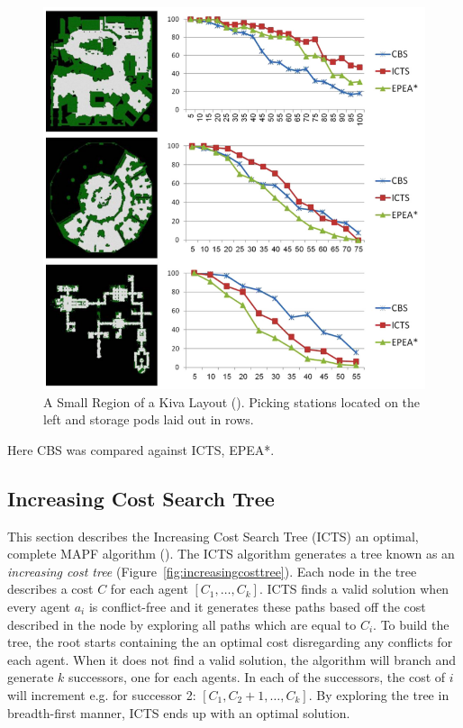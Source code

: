 \documentclass[a4paper,11pt]{article}
\begin{document}
\begin{figure}[!htb]
\begin{minipage}{0.4\linewidth}
	\includegraphics[width=\linewidth]{graphics/cbsresults1}
	\caption{A Small Region of a Kiva Layout (\cite{sharon2015conflict}). Picking stations located on the left and storage pods laid out in rows.}
	\label{cbsresults2}
	\end{minipage}
\end{figure}

Here CBS was compared against ICTS, EPEA*.

\subsection{Increasing Cost Search Tree}
This section describes the Increasing Cost Search Tree (ICTS) an optimal, complete MAPF algorithm (\cite{sharon2011increasing}). The ICTS algorithm generates a tree known as an \textit{increasing cost tree} (Figure~\ref{fig:increasingcosttree}). Each node in the tree describes a cost $C$ for each agent $[C_1,\dots,C_k]$. ICTS finds a valid solution when every agent $a_i$ is conflict-free and it generates these paths based off the cost described in the node by exploring all paths which are equal to $C_i$.  To build the tree, the root starts containing the an optimal cost disregarding any conflicts for each agent. When it does not find a valid solution, the algorithm will branch and generate $k$ successors, one for each agents. In each of the successors, the cost of $i$ will increment e.g. for successor 2: $[C_1,C_{2}+1,\dots,C_k]$. By exploring the tree in breadth-first manner, ICTS ends up with an optimal solution.
\end{document}
